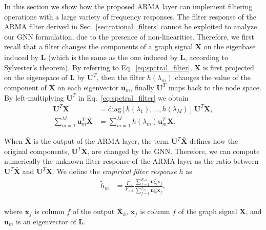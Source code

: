 \documentclass{article}
\def\x{{\mathbf x}}
\def\u{{\mathbf u}}
\def\X{{\mathbf X}}
\def\U{{\mathbf U}}
\def\L{{\mathbf L}}
\def\L{{\mathbf L}}
\begin{document}
In this section we show how the proposed ARMA layer can implement filtering operations with a large variety of frequency responses.
The filter response of the ARMA filter derived in Sec.~\ref{sec:rational_filters} cannot be exploited to analyze our GNN formulation, due to the presence of non-linearities.
Therefore, we first recall that a filter changes the components of a graph signal $\X$ on the eigenbase induced by $\L$ (which is the same as the one induced by $\tilde{\L}$, according to Sylvester's theorem).
By referring to Eq.~\eqref{eq:spctral_filter}, $\X$ is first projected on the eigenspace of $\L$ by $\U^T$, then the filter $h(\lambda_m)$ changes the value of the component of $\X$ on each eigenvector $\u_m$, finally $\U^T$ maps back to the node space.
By left-multiplying $\U^T$ in Eq.~\eqref{eq:spctral_filter} we obtain
\begin{equation}
    \label{eq:spectral_filter_modified}
    \begin{aligned}
    \U^T \bar \X & = \text{diag}[h(\lambda_1), \dots, h(\lambda_M)] \, \U^T \X, \\
    \sum_{m=1}^M \mathbf{u}^T_m \bar \X & = \sum_{m=1}^M h(\lambda_m)  \mathbf{u}^T_m \X.
    \end{aligned}
\end{equation}

When $\bar \X$ is the output of the ARMA layer, the term $\U^T \bar \X$ defines how the original components, $\U^T \X$, are changed by the GNN.
Therefore, we can compute numerically the unknown filter response of the ARMA layer as the ratio between $\U^T \bar \X$ and $\U^T \X$.
We define the \textit{empirical filter response} $\tilde{h}$ as
\begin{equation}
    \label{eq:filter_approx}
    \begin{aligned}
    \tilde{h}_{m} &= \frac{F_\text{in}}{F_\text{out}} \frac{\sum_{f=1}^{F_\text{out}} \u_m^T \bar{\x}_{f}}{\sum_{f=1}^{F_\text{in}} \u_m^T\x_f}, \\
\end{aligned}
\end{equation}

where $\bar{\x}_{f}$ is column $f$ of the output $\bar \X_k$, $\x_f$ is column $f$ of the graph signal $\X$, and $\u_m$ is an eigenvector of $\L$.
\end{document}
